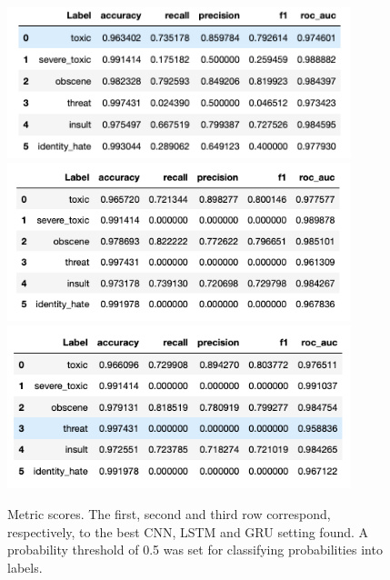 \documentclass{report}
\begin{document}
\begin{figure}[!h]
\centering
  \includegraphics[width=100mm]{../local/plots_tables/cnn_table.png}
\\
\centering
  \includegraphics[width=100mm]{../local/plots_tables/lstm_table.png}
\\
\centering
  \includegraphics[width=100mm]{../local/plots_tables/gru_table.png}
  \caption{Metric scores. The first, second and third row correspond, respectively, to 
  the best CNN, LSTM and GRU setting found. A probability threshold of 0.5 was set 
  for classifying probabilities into labels.}
  \label{fig:tables}
\end{figure}
\end{document}
